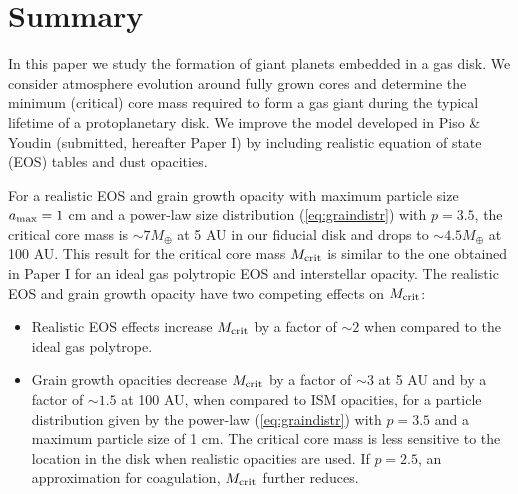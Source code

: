 \documentclass[apj]{emulateapj}
\begin{document}
 \section{Summary}
 \label{conclusions}
 
 In this paper we study the formation of giant planets embedded in a gas disk. We consider atmosphere evolution around fully grown cores and determine the minimum (critical) core mass required to form a gas giant during the typical lifetime of a protoplanetary disk. We improve the model developed in Piso \& Youdin (submitted, hereafter Paper I) by including realistic equation of state (EOS) tables and dust opacities. 
 
 For a realistic EOS and grain growth opacity with maximum particle size $a_{\rm max}=1$ cm and a power-law size distribution (\ref{eq:graindistr}) with $p=3.5$, the critical core mass is $\sim$$7 M_{\oplus}$ at 5 AU in our fiducial disk and drops to $\sim$$4.5 M_{\oplus}$ at 100 AU. This result for the critical core mass $M_{\rm crit}$ is similar to the one obtained in Paper I for an ideal gas polytropic EOS and interstellar opacity. The realistic EOS and grain growth opacity have two competing effects on $M_{\rm crit}$:
 
 \begin{itemize}
 \item Realistic EOS effects increase $M_{\rm crit}$ by a factor of $\sim$$2$ when compared to the ideal gas polytrope.
 \item Grain growth opacities decrease $M_{\rm crit}$ by a factor of $\sim$$3$ at 5 AU and by a factor of $\sim$$1.5$ at 100 AU, when compared to ISM opacities, for a particle distribution given by the power-law (\ref{eq:graindistr}) with $p=3.5$ and a maximum particle size of 1 cm. The critical core mass is less sensitive to the location in the disk when realistic opacities are used. If $p=2.5$, an approximation for coagulation,  $M_{\rm crit}$ further reduces. 
 \end{itemize}
 
  
 
\end{document}
